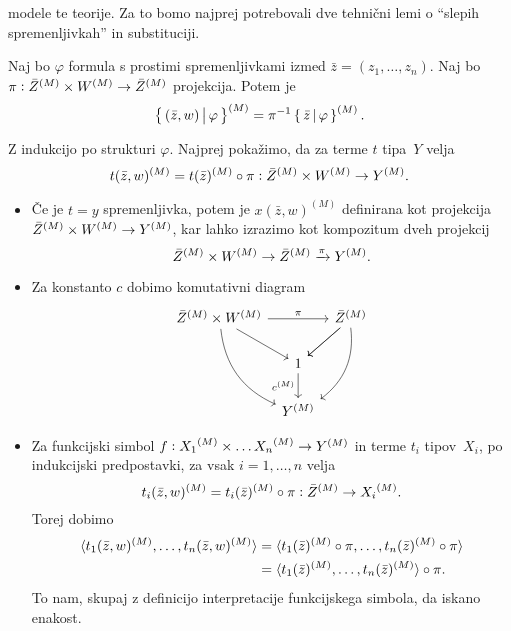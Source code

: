 \documentclass[../kategoricna_logika.tex]{subfiles}
\begin{document}
modele te teorije.  Za to bomo najprej potrebovali dve tehnični lemi o
"`slepih spremenljivkah"' in substituciji.
\begin{lema}\label{lema:slepe-spremenljivke}
  Naj bo $\varphi$ formula s prostimi spremenljivkami izmed
  $\bar{z} = (z_1, \ldots, z_n)$.  Naj bo
  $\pi : \bar{Z}^{(M)} \times W^{(M)} \to {\bar{Z}}^{(M)}$
  projekcija. Potem je
  $$\left\lbrace\,(\bar{z}, w) \,\middle|\, \varphi\,\right\rbrace^{(M)} = \pi^{-1} \left\lbrace\,\bar{z} \,\middle|\, \varphi\,\right\rbrace^{(M)}.$$
\end{lema}
\begin{dokaz}
  Z indukcijo po strukturi $\varphi$.  Najprej pokažimo, da za terme
  $t$ tipa~$Y$ velja
  $$t(\bar{z}, w)^{(M)} = t(\bar{z})^{(M)} \circ \pi : {\bar{Z}}^{(M)} \times W^{(M)} \to {Y}^{(M)}.$$
  \begin{itemize}
  \item Če je $t = y$ spremenljivka, potem je $x(\bar{z},w)^{(M)}$
    definirana kot projekcija
    ${\bar{Z}}^{(M)} \times {W}^{(M)} \to Y^{(M)}$, kar lahko
    izrazimo kot kompozitum dveh projekcij
      $${\bar{Z}}^{(M)} \times {W}^{(M)} \to \bar{Z}^{(M)} \xrightarrow{\pi} Y^{(M)}.$$

    \item Za konstanto $c$ dobimo komutativni diagram
      \begin{equation*}
        \begin{tikzcd}[column sep=tiny]
          \bar{Z}^{(M)} \times \interp{W} \ar[ddr, bend right] \ar[dr] \ar[rr, "\pi"] & &
          \bar{Z}^{(M)} \ar[dl] \ar[dl] \ar[ddl, bend left] \\
          & 1 \ar[d, "c^{(M)}"'] & \\
          & Y^{(M)} &
        \end{tikzcd}
      \end{equation*}
    
    \item Za funkcijski simbol
      $f : {X_1}^{(M)} \times \ldots {X_n}^{(M)} \to {Y}^{(M)}$ in
      terme $t_i$ tipov~$X_i$, po indukcijski predpostavki, za vsak
      $i = 1, \ldots, n$ velja
      \[t_i(\bar{z},w)^{(M)} = t_i(\bar{z})^{(M)} \circ \pi :
      {\bar{Z}}^{(M)} \to {X_i}^{(M)}.\]
      Torej dobimo
      \begin{align*}
        \langle t_1(\bar{z}, w)^{(M)}, \ldots, t_n(\bar{z}, w)^{(M)} \rangle &= \langle t_1(\bar{z})^{(M)} \circ \pi, \ldots, t_n(\bar{z})^{(M)} \circ \pi \rangle \\
                                                                     &= \langle t_1(\bar{z})^{(M)}, \ldots, t_n(\bar{z})^{(M)} \rangle \circ \pi.
      \end{align*}
      To nam, skupaj z definicijo interpretacije funkcijskega simbola,
      da iskano enakost.


\end{itemize}
\end{dokaz}
\end{document}
